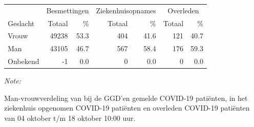 \documentclass[
  english,
  man,floatsintext]{apa6}
\begin{document}
\begin{table}[H]
\centering\begingroup\fontsize{11}{13}\selectfont

\begin{threeparttable}
\begin{tabular}{lrrrrrr}
\toprule
\multicolumn{1}{c}{ } & \multicolumn{2}{c}{Besmettingen} & \multicolumn{2}{c}{Ziekenhuisopnames} & \multicolumn{2}{c}{Overleden} \\
\cmidrule(l{3pt}r{3pt}){2-3} \cmidrule(l{3pt}r{3pt}){4-5} \cmidrule(l{3pt}r{3pt}){6-7}
Geslacht & Totaal & \% & Totaal & \% & Totaal & \%\\
\midrule
Vrouw & 49238 & 53.3 & 404 & 41.6 & 121 & 40.7\\
Man & 43105 & 46.7 & 567 & 58.4 & 176 & 59.3\\
Onbekend & -1 & 0.0 & 0 & 0.0 & 0 & 0.0\\
\bottomrule
\end{tabular}
\begin{tablenotes}
\item \textit{Note: } 
\item Man-vrouwverdeling van bij de GGD’en gemelde COVID-19 patiënten, in het ziekenhuis opgenomen COVID-19 patiënten en overleden COVID-19 patiënten van 04 oktober t/m 18 oktober 10:00 uur.
\end{tablenotes}
\end{threeparttable}
\endgroup{}
\end{table}
\newpage
\end{document}
